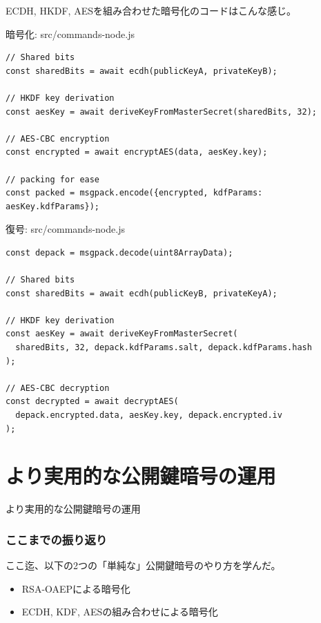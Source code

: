 \documentclass[12pt,dvipdfmx]{beamer}
\begin{document}
\begin{frame}[fragile]
ECDH, HKDF, AESを組み合わせた暗号化のコードはこんな感じ。
\begin{block}{\small 暗号化: src/commands-node.js}
\scriptsize
\begin{verbatim}
// Shared bits
const sharedBits = await ecdh(publicKeyA, privateKeyB);

// HKDF key derivation
const aesKey = await deriveKeyFromMasterSecret(sharedBits, 32);

// AES-CBC encryption
const encrypted = await encryptAES(data, aesKey.key);

// packing for ease
const packed = msgpack.encode({encrypted, kdfParams: aesKey.kdfParams});
\end{verbatim}
\end{block}
\end{frame}

\begin{frame}[fragile]
\begin{block}{\small 復号: src/commands-node.js}
\scriptsize
\begin{verbatim}
const depack = msgpack.decode(uint8ArrayData);

// Shared bits
const sharedBits = await ecdh(publicKeyB, privateKeyA);

// HKDF key derivation
const aesKey = await deriveKeyFromMasterSecret(
  sharedBits, 32, depack.kdfParams.salt, depack.kdfParams.hash
);

// AES-CBC decryption
const decrypted = await decryptAES(
  depack.encrypted.data, aesKey.key, depack.encrypted.iv
);
\end{verbatim}
\end{block}
\end{frame}


\section{より実用的な公開鍵暗号の運用}
\begin{frame}
\centering
{\Large より実用的な公開鍵暗号の運用}
\end{frame}

\begin{frame}
\frametitle{ここまでの振り返り}
ここ迄、以下の2つの「単純な」公開鍵暗号のやり方を学んだ。
\begin{itemize}
 \item RSA-OAEPによる暗号化
 \item ECDH, KDF, AESの組み合わせによる暗号化
\end{itemize}
\end{frame}
\end{document}
